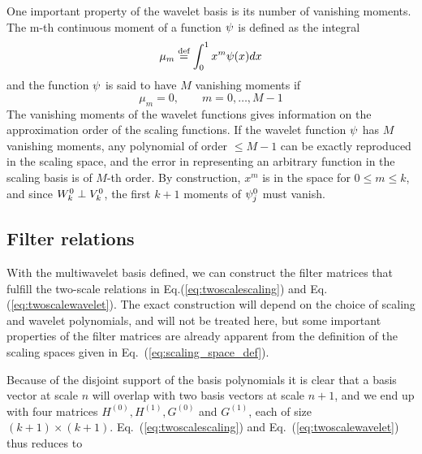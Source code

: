 One important property of the wavelet basis is its number of vanishing moments. 
The m-th continuous moment of a function $\psi$ is defined as the integral
\begin{equation}
    \mu_m \stackrel{\text{def}}{\hbox{=}} \int_0^1 x^m \psi(x)dx 	
\end{equation}
and the function $\psi$ is said to have $M$ vanishing moments if 
\begin{equation}
    \mu_m = 0, \qquad m=0,\dots, M-1
\end{equation}
The vanishing moments of the wavelet functions gives information on the 
approximation order of the scaling functions. If the wavelet function $\psi$ 
has $M$ vanishing moments, any polynomial of order $\leq M-1$ can be exactly 
reproduced in the scaling space, and the error in representing an arbitrary 
function in the scaling basis is of $M$-th order. By construction, $x^m$ is in 
the space  for $0\leq m \leq k$, and since ${W}_{k}^{0} 
\perp {V}_{k}^{0}$, the first $k+1$ moments of $\psi^0_j$ must vanish.

\subsection{Filter relations}
With the multiwavelet basis defined, we can construct the filter matrices that 
fulfill the two-scale relations in Eq.(\ref{eq:twoscalescaling}) and
Eq.(\ref{eq:twoscalewavelet}). The exact construction will depend on the choice
of scaling and wavelet polynomials, and will not be treated here, but some 
important properties of the filter matrices are already apparent from the
definition of the scaling spaces given in Eq.~(\ref{eq:scaling_space_def}). 

Because of the disjoint support of the basis polynomials it is clear that
a basis vector at scale $n$ will overlap with two basis vectors at scale $n+1$,
and we end up with four matrices $H^{(0)}, H^{(1)}, G^{(0)}$ and $G^{(1)}$, 
each of size $(k+1) \times (k+1)$. Eq.~(\ref{eq:twoscalescaling}) and 
Eq.~(\ref{eq:twoscalewavelet}) thus reduces to

